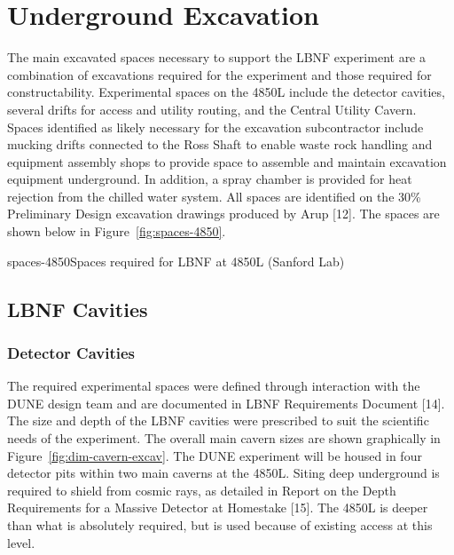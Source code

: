 \chapter{Underground Excavation}
\label{ch:fscf-excav}

The main excavated spaces necessary to support the LBNF experiment are a combination of excavations required for the experiment and those required for constructability. Experimental spaces on the 4850L include the detector cavities, several drifts for access and utility routing, and the Central Utility Cavern. Spaces identified as likely necessary for the excavation subcontractor include mucking drifts connected to the Ross Shaft to enable waste rock handling and equipment assembly shops to provide space to assemble and maintain excavation equipment underground. In addition, a spray chamber is provided for heat rejection from the chilled water system. All spaces are identified on the 30\% Preliminary Design excavation drawings produced by Arup [12]. The spaces are shown below in Figure~\ref{fig:spaces-4850}.

\begin{cdrfigure}{spaces-4850}{Spaces required for LBNF at 4850L (Sanford Lab)}
\end{cdrfigure}

\section{LBNF Cavities}
\label{sec:fscf-excav-cav}

\subsection{Detector Cavities}
\label{sec:fscf-excav-det}

The required experimental spaces were defined through interaction with the DUNE design team and are documented in LBNF Requirements Document [14]. The size and depth of the LBNF cavities were prescribed to suit the scientific needs of the experiment. The overall main cavern sizes are shown graphically in Figure~\ref{fig:dim-cavern-excav}. The DUNE experiment will be housed in four detector pits within two main caverns at the 4850L. Siting deep underground is required to shield from cosmic rays, as detailed in Report on the Depth Requirements for a Massive Detector at Homestake [15]. The 4850L is deeper than what is absolutely required, but is used because of existing access at this level. 

